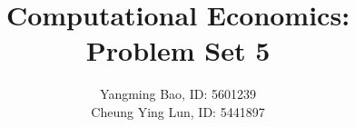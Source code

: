 \documentclass[11pt]{article}
\title{Computational Economics: Problem Set 5}
\date{}
\author{Yangming Bao, ID: 5601239\\Cheung Ying Lun, ID: 5441897}
\begin{document}
\maketitle





\pagebreak
\appendix

\end{document}
